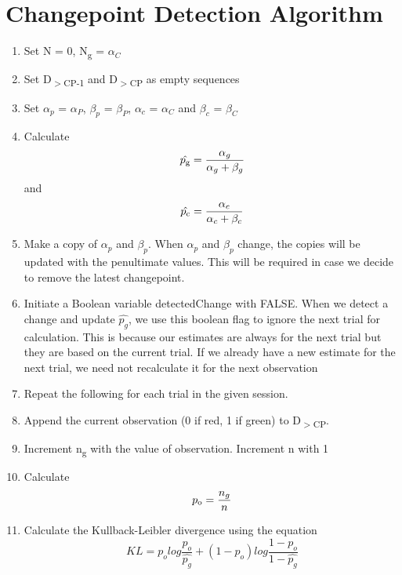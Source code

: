 \documentclass{article}
\begin{document}
\section{\\Changepoint Detection Algorithm}
\begin{enumerate}
\item Set N = 0, N\textsubscript{g} =  $\alpha_C$

\item Set D\textsubscript{$>$CP-1} and D\textsubscript{$>$CP} as empty sequences

\item Set $\alpha_p$ = $\alpha_P$, $\beta_p$ =  $\beta_P$, $\alpha_c$ = $\alpha_C$ and $\beta_c$ =  $\beta_C$

\item Calculate \[ \hat{p\textsubscript{g}} = \frac{\alpha_g}{\alpha_g + \beta_g} \] and \[ \hat{p\textsubscript{c}} = \frac{\alpha_c}{\alpha_c + \beta_c} \]

\item Make a copy of $\alpha_p$ and $\beta_p$. When $\alpha_p$ and $\beta_p$ change, the copies will be updated with the penultimate values. This will be required in case we decide to remove the latest changepoint.

\item Initiate a Boolean variable detectedChange with FALSE. When we detect a change and update $\hat{p_g}$, we use this boolean flag to ignore the next trial for calculation. This is because our estimates are always for the next trial but they are based on the current trial. If we already have a new estimate for the next trial, we need not recalculate it for the next observation

\item Repeat the following for each trial in the given session.

\item Append the current observation (0 if red, 1 if green) to  D\textsubscript{$>$CP}.

\item Increment n\textsubscript{g} with the value of observation. Increment n with 1

\item Calculate 
\[ p\textsubscript{o} = \frac{n_g}{n} \]

\item Calculate the Kullback-Leibler divergence using the equation
\[ KL = p_olog\frac{p_o}{\hat{p_g}} + (1 - p_o)log\frac{1 - p_o}{1 - \hat{p_g}} \]


\end{enumerate}
\end{document}
